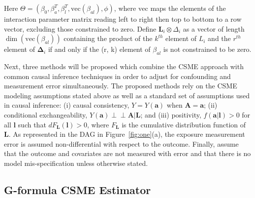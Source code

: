 \documentclass[useAMS,usenatbib,referee]{biom}
\begin{document}
Here $\Theta = (\beta_{0}, \beta^{T}_{a}, \beta^{T}_{l}, \text{vec}(\beta_{al}), \phi)$, where $\text{vec}$ maps the elements of the interaction parameter matrix reading left to right then top to bottom to a row vector, excluding those constrained to zero. Define $\bm{L}_{i} \otimes \Delta_{i}$ as a vector of length $\dim(\text{vec}(\beta_{al}))$ containing the product of the $k^{th}$ element of $L_{i}$ and the $r^{th}$ element of $\bm{\Delta}_{i}$ if and only if the (r, k) element of $\beta_{al}$ is not constrained to be zero.

Next, three methods will be proposed which combine the CSME approach with common causal inference techniques in order to adjust for confounding and measurement error simultaneously. The proposed methods rely on the CSME modeling assumptions stated above as well as a standard set of assumptions used in causal inference: (i) causal consistency, $Y = Y(\bm{a})$ when $\bm{A} = \bm{a}$; (ii) conditional exchangeability, $Y(\bm{a}) \perp \!\!\! \perp \bm{A} | \bm{L}$; and (iii) positivity, $f(\bm{a} | \bm{l}) > 0$ for all $\bm{l}$ such that $dF_{\bm{L}}(\bm{l}) > 0$, where $F_{\bm{L}}$ is the cumulative distribution function of $\bm{L}$. As represented in the DAG in Figure~\ref{fig:one}(a), the exposure measurement error is assumed non-differential with respect to the outcome. Finally, assume that the outcome and covariates are not measured with error and that there is no model mis-specification unless otherwise stated.

\subsection{G-formula CSME Estimator}
\end{document}
